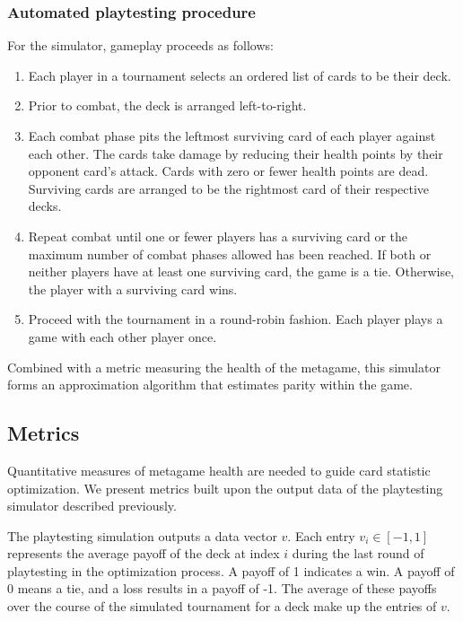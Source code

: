 \subsubsection{Automated playtesting procedure} \label{sec:tourney}

For the simulator, gameplay proceeds as follows:

\begin{enumerate}
	\item Each player in a tournament selects an ordered list
	of cards to be their deck.
	\item Prior to combat, the deck is arranged left-to-right.
	\item Each combat phase pits the leftmost surviving card
	of each player against each other. The cards take damage by 
	reducing their health points by their opponent card's attack.
	Cards with zero or fewer health points are dead. Surviving cards
	are arranged to be the rightmost card of their respective decks.
	\item Repeat combat until one or fewer players has a surviving card
	or the maximum number of combat phases allowed has been reached.
	If both or neither players have at least one surviving card, the game is a tie.
	Otherwise, the player with a surviving card wins.
	\item Proceed with the tournament in a round-robin fashion. Each 
	player plays a game with each other player once.
\end{enumerate}

Combined with a metric measuring the health of the metagame, this simulator 
forms an approximation algorithm that estimates parity within the game.

\subsection{Metrics} \label{sec:metrics}

Quantitative measures of metagame health are needed to guide 
card statistic optimization. We present metrics built upon the
output data of the playtesting simulator described previously.

The playtesting simulation outputs a data vector $v$.
Each entry $v_i \in [-1, 1]$ represents the average payoff of
the deck at index $i$ during the last round of playtesting in
the optimization process. A payoff of 1 indicates a win. A
payoff of 0 means a tie, and a loss results in a payoff of -1.
The average of these payoffs over the course of the simulated
tournament for a deck make up the entries of $v$.

